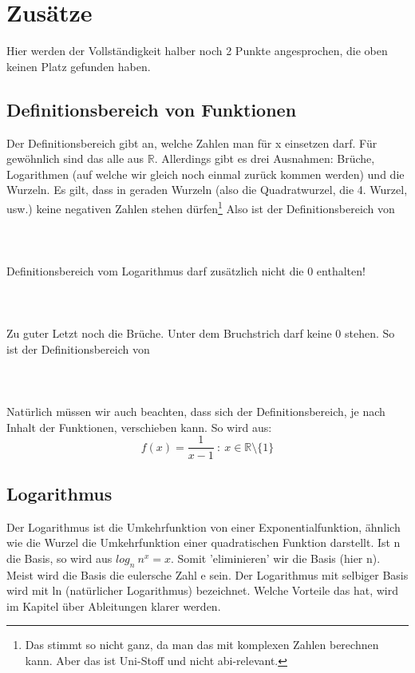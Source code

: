 \section{Zusätze}
	Hier werden der Vollständigkeit halber noch 2 Punkte angesprochen, die oben
	keinen Platz gefunden haben.

	\subsection{Definitionsbereich von Funktionen}
		Der Definitionsbereich gibt an, welche Zahlen man für x einsetzen darf. Für
		gewöhnlich sind das alle aus \(\mathbb{R}\). Allerdings gibt es drei
		Ausnahmen:
		Brüche, Logarithmen (auf welche wir gleich noch einmal zurück kommen werden)
		und die Wurzeln. Es gilt, dass in geraden Wurzeln (also die Quadratwurzel, die
		4. Wurzel, usw.) keine negativen Zahlen stehen dürfen\footnote{Das stimmt so
		nicht ganz, da man das mit komplexen Zahlen berechnen kann. Aber das ist
		Uni-Stoff und nicht abi-relevant.} Also ist der Definitionsbereich von
		\\ \\
		\formel{\[f(x)=\sqrt{x}\ :\ x\geq 0\]}
		\\ \\
		Definitionsbereich vom Logarithmus darf	zusätzlich nicht die 0 enthalten!
		\\ \\
		\formel{\[f(x)=ln(x)\ :\ x>0\]}
		\\ \\
		Zu guter Letzt noch die Brüche. Unter dem Bruchstrich darf keine 0 stehen. So
		ist der Definitionsbereich von
		\\ \\
		\formel{\[f(x)=\frac{1}{x}\ :\ x\in\mathbb{R}\setminus\{0\}\]}
		\\ \\
		Natürlich müssen wir auch beachten, dass sich der Definitionsbereich, je nach
		Inhalt der Funktionen, verschieben kann. So wird aus:
		\[f(x)=\frac{1}{x-1}\ :\ x\in\mathbb{R}\setminus\{1\}\]
	
	\subsection{Logarithmus}
		Der Logarithmus ist die Umkehrfunktion von einer Exponentialfunktion, ähnlich
		wie die Wurzel die Umkehrfunktion einer quadratischen Funktion darstellt. Ist
		n die Basis, so wird aus \(log_n\ n^x=x\). Somit 'eliminieren' wir die Basis
		(hier n). Meist wird die Basis die eulersche Zahl e sein. Der Logarithmus mit
		selbiger Basis wird mit ln (natürlicher Logarithmus) bezeichnet.
		Welche Vorteile das hat, wird im Kapitel über Ableitungen klarer werden.
